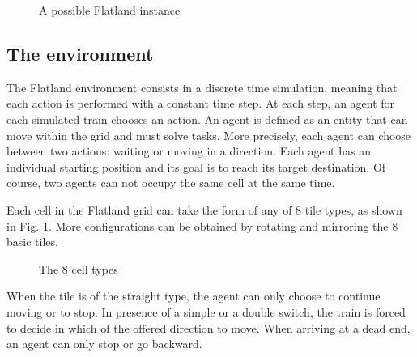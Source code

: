 \documentclass[a4paper, 12pt]{article}
\numberwithin{equation}{section}
\begin{document}
\begin{figure}[h]
	\centering
		\caption{A possible Flatland instance}
\end{figure}

\subsection[The environment]{The environment \cite{flatland-challenge}}

The Flatland environment consists in a discrete time simulation, meaning that each action is performed with a constant time step. At each step, an agent for each simulated train chooses an action. An agent is defined as an entity that can move within the grid and must solve tasks. More precisely, each agent can choose between two actions: waiting or moving in a direction. Each agent has an individual starting position and its goal is to reach its target destination. Of course, two agents can not occupy the same cell at the same time.

Each cell in the Flatland grid can take the form of any of 8 tile types, as shown in Fig. \ref{fig:cell-types}. More configurations can be obtained by rotating and mirroring the 8 basic tiles.

\begin{figure}[h]
	\centering
		\caption{The 8 cell types}
	\label{fig:cell-types}
\end{figure}

When the tile is of the straight type, the agent can only choose to continue moving or to stop. In presence of a simple or a double switch, the train is forced to decide in which of the offered direction to move. When arriving at a dead end, an agent can only stop or go backward.
\end{document}
